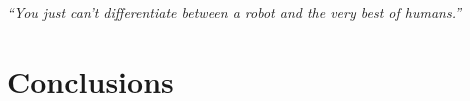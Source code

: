 \begin{savequote}[10cm]
{\it ``You just can't differentiate between a robot and the very best of humans.''}
\end{savequote}

\chapter{Conclusions}
\label{Chap:Conclusions}
